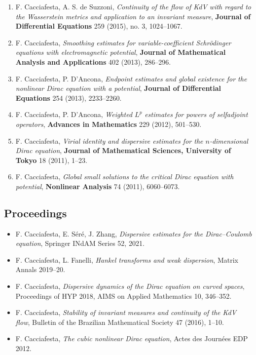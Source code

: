 \documentclass[10pt,a4paper]{article}
\newcommand{\venue}[1]{\textbf{#1}}
\newcommand{\FC}{{F. Cacciafesta}}
\begin{document}
\begin{enumerate}[label=\arabic*.,wide=0pt]
\item \FC, A. S. de Suzzoni, \emph{Continuity of the flow of KdV with regard to the Wasserstein metrics and application to an invariant measure}, \venue{Journal of Differential Equations} 259 (2015), no. 3, 1024--1067.

\item \FC, \emph{Smoothing estimates for variable-coefficient Schr\"odinger equations with electromagnetic potential}, \venue{Journal of Mathematical Analysis and Applications} 402 (2013), 286--296.

\item \FC, P. D'Ancona, \emph{Endpoint estimates and global existence for the nonlinear Dirac equation with a potential}, \venue{Journal of Differential Equations} 254 (2013), 2233--2260.

\item \FC, P. D'Ancona, \emph{Weighted $L^p$ estimates for powers of selfadjoint operators}, \venue{Advances in Mathematics} 229 (2012), 501--530.

\item \FC, \emph{Virial identity and dispersive estimates for the $n$-dimensional Dirac equation}, \venue{Journal of Mathematical Sciences, University of Tokyo} 18 (2011), 1--23.

\item \FC, \emph{Global small solutions to the critical Dirac equation with potential}, \venue{Nonlinear Analysis} 74 (2011), 6060--6073.
\end{enumerate}

\subsection{Proceedings}
\begin{itemize}
\small
\item \FC, E. S\'er\'e, J. Zhang, \emph{Dispersive estimates for the Dirac--Coulomb equation}, Springer INdAM Series 52, 2021.
\item \FC, L. Fanelli, \emph{Hankel transforms and weak dispersion}, Matrix Annals 2019--20.
\item \FC, \emph{Dispersive dynamics of the Dirac equation on curved spaces}, Proceedings of HYP 2018, AIMS on Applied Mathematics 10, 346--352.
\item \FC, \emph{Stability of invariant measures and continuity of the KdV flow}, Bulletin of the Brazilian Mathematical Society 47 (2016), 1--10.
\item \FC, \emph{The cubic nonlinear Dirac equation}, Actes des Journ\'ees EDP 2012.
\end{itemize}
\end{document}
